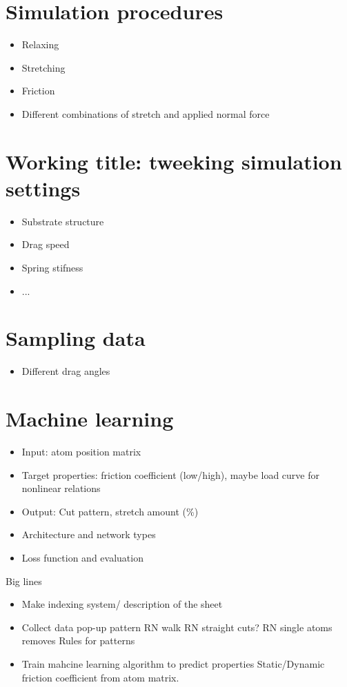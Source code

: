 \section{Simulation procedures}
\begin{itemize}
  \item Relaxing
  \item Stretching 
  \item Friction 
  \item Different combinations of stretch and applied normal force
\end{itemize}

\section{Working title: tweeking simulation settings} %
\begin{itemize}
  \item Substrate structure
  \item Drag speed
  \item Spring stifness
  \item ...
\end{itemize}

\section{Sampling data}
\begin{itemize}
  \item Different drag angles
\end{itemize}

\section{Machine learning}
\begin{itemize}
  \item Input: atom position matrix
  \item Target properties: friction coefficient (low/high), maybe load curve for nonlinear relations
  \item Output: Cut pattern, stretch amount (\%)
  \item Architecture and network types
  \item Loss function and evaluation
\end{itemize}



\newpage
Big lines
\begin{itemize}
    \item Make indexing system/ description of the sheet 
    \item Collect data 
    \subitem pop-up pattern
    \subitem RN walk 
    \subitem RN straight cuts?
    \subitem RN single atoms removes
    \subitem Rules for patterns
    \item Train mahcine learning algorithm to predict properties
    \subitem Static/Dynamic friction coefficient from atom matrix. 
\end{itemize}    


